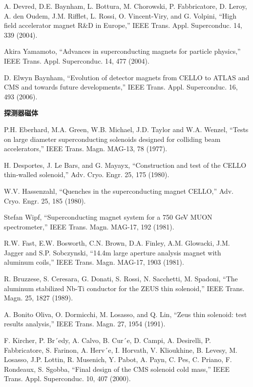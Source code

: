 \noindent [9.282] A. Devred, D.E. Baynham, L. Bottura, M. Chorowski, P. Fabbricatore, D. Leroy,
A. den Oudem, J.M. Rifflet, L. Rossi, O. Vincent-Viry, and G. Volpini, ``High
field accelerator magnet R\&D in Europe,” IEEE Trans. Appl. Superconduc. 14,
339 (2004).

\noindent [9.283] Akira Yamamoto, ``Advances in superconducting magnets for particle physics,”
IEEE Trans. Appl. Superconduc. 14, 477 (2004).

\noindent [9.284] D. Elwyn Baynham, ``Evolution of detector magnets from CELLO to ATLAS
and CMS and towards future developments,” IEEE Trans. Appl. Superconduc.
16, 493 (2006).

\noindent \textbf{探测器磁体}

\noindent [9.285] P.H. Eberhard, M.A. Green, W.B. Michael, J.D. Taylor and W.A. Wenzel, ``Tests
on large diameter superconducting solenoids designed for colliding beam accelerators,”
IEEE Trans. Magn. MAG-13, 78 (1977).

\noindent [9.286] H. Desportes, J. Le Bars, and G. Mayayx, ``Construction and test of the CELLO
thin-walled solenoid,” Adv. Cryo. Engr. 25, 175 (1980).

\noindent [9.287] W.V. Hassenzahl, ``Quenches in the superconducting magnet CELLO,” Adv.
Cryo. Engr. 25, 185 (1980).

\noindent [9.288] Stefan Wipf, ``Superconducting magnet system for a 750 GeV MUON spectrometer,”
IEEE Trans. Magn. MAG-17, 192 (1981).

\noindent [9.289] R.W. Fast, E.W. Bosworth, C.N. Brown, D.A. Finley, A.M. Glowacki, J.M. Jagger
and S.P. Sobczynski, ``14.4m large aperture analysis magnet with aluminum
coils,” IEEE Trans. Magn. MAG-17, 1903 (1981).

\noindent [9.290] R. Bruzzese, S. Ceresara, G. Donati, S. Rossi, N. Sacchetti, M. Spadoni, ``The
aluminum stabilized Nb-Ti conductor for the ZEUS thin solenoid,” IEEE Trans.
Magn. 25, 1827 (1989).

\noindent [9.291] A. Bonito Oliva, O. Dormicchi, M. Losasso, and Q. Lin, ``Zeus thin solenoid: test
results analysis,” IEEE Trans. Magn. 27, 1954 (1991).

\noindent [9.292] F. Kircher, P. Br´edy, A. Calvo, B. Cur´e, D. Campi, A. Desirelli, P. Fabbricatore,
S. Farinon, A. Herv´e, I. Horvath, V. Klioukhine, B. Levesy, M. Losasso, J.P. Lottin,
R. Musenich, Y. Pabot, A. Payn, C. Pes, C. Priano, F. Rondeaux, S. Sgobba,
``Final design of the CMS solenoid cold mass,” IEEE Trans. Appl. Superconduc.
10, 407 (2000).


